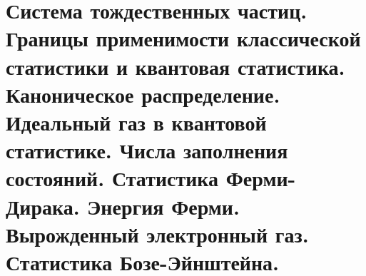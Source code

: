 \chapter{Система тождественных частиц. Границы применимости классической 
статистики и квантовая статистика. Каноническое распределение. 
Идеальный газ в квантовой статистике. Числа заполнения состояний. 
Статистика Ферми-Дирака. Энергия Ферми. Вырожденный электронный газ. 
Статистика Бозе-Эйнштейна.}
\newpage
